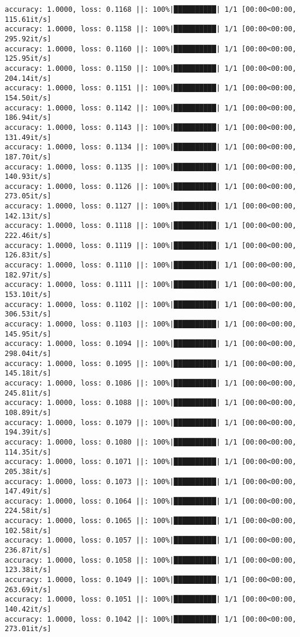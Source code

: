 \documentclass[
]{article}
\begin{document}
\begin{verbatim}
accuracy: 1.0000, loss: 0.1168 ||: 100%|██████████| 1/1 [00:00<00:00, 115.61it/s]
accuracy: 1.0000, loss: 0.1158 ||: 100%|██████████| 1/1 [00:00<00:00, 295.92it/s]
accuracy: 1.0000, loss: 0.1160 ||: 100%|██████████| 1/1 [00:00<00:00, 125.95it/s]
accuracy: 1.0000, loss: 0.1150 ||: 100%|██████████| 1/1 [00:00<00:00, 204.14it/s]
accuracy: 1.0000, loss: 0.1151 ||: 100%|██████████| 1/1 [00:00<00:00, 154.50it/s]
accuracy: 1.0000, loss: 0.1142 ||: 100%|██████████| 1/1 [00:00<00:00, 186.94it/s]
accuracy: 1.0000, loss: 0.1143 ||: 100%|██████████| 1/1 [00:00<00:00, 131.49it/s]
accuracy: 1.0000, loss: 0.1134 ||: 100%|██████████| 1/1 [00:00<00:00, 187.70it/s]
accuracy: 1.0000, loss: 0.1135 ||: 100%|██████████| 1/1 [00:00<00:00, 140.93it/s]
accuracy: 1.0000, loss: 0.1126 ||: 100%|██████████| 1/1 [00:00<00:00, 273.05it/s]
accuracy: 1.0000, loss: 0.1127 ||: 100%|██████████| 1/1 [00:00<00:00, 142.13it/s]
accuracy: 1.0000, loss: 0.1118 ||: 100%|██████████| 1/1 [00:00<00:00, 222.46it/s]
accuracy: 1.0000, loss: 0.1119 ||: 100%|██████████| 1/1 [00:00<00:00, 126.83it/s]
accuracy: 1.0000, loss: 0.1110 ||: 100%|██████████| 1/1 [00:00<00:00, 182.97it/s]
accuracy: 1.0000, loss: 0.1111 ||: 100%|██████████| 1/1 [00:00<00:00, 153.10it/s]
accuracy: 1.0000, loss: 0.1102 ||: 100%|██████████| 1/1 [00:00<00:00, 306.53it/s]
accuracy: 1.0000, loss: 0.1103 ||: 100%|██████████| 1/1 [00:00<00:00, 145.95it/s]
accuracy: 1.0000, loss: 0.1094 ||: 100%|██████████| 1/1 [00:00<00:00, 298.04it/s]
accuracy: 1.0000, loss: 0.1095 ||: 100%|██████████| 1/1 [00:00<00:00, 145.18it/s]
accuracy: 1.0000, loss: 0.1086 ||: 100%|██████████| 1/1 [00:00<00:00, 245.81it/s]
accuracy: 1.0000, loss: 0.1088 ||: 100%|██████████| 1/1 [00:00<00:00, 108.89it/s]
accuracy: 1.0000, loss: 0.1079 ||: 100%|██████████| 1/1 [00:00<00:00, 194.39it/s]
accuracy: 1.0000, loss: 0.1080 ||: 100%|██████████| 1/1 [00:00<00:00, 114.35it/s]
accuracy: 1.0000, loss: 0.1071 ||: 100%|██████████| 1/1 [00:00<00:00, 205.38it/s]
accuracy: 1.0000, loss: 0.1073 ||: 100%|██████████| 1/1 [00:00<00:00, 147.49it/s]
accuracy: 1.0000, loss: 0.1064 ||: 100%|██████████| 1/1 [00:00<00:00, 224.58it/s]
accuracy: 1.0000, loss: 0.1065 ||: 100%|██████████| 1/1 [00:00<00:00, 102.58it/s]
accuracy: 1.0000, loss: 0.1057 ||: 100%|██████████| 1/1 [00:00<00:00, 236.87it/s]
accuracy: 1.0000, loss: 0.1058 ||: 100%|██████████| 1/1 [00:00<00:00, 123.38it/s]
accuracy: 1.0000, loss: 0.1049 ||: 100%|██████████| 1/1 [00:00<00:00, 263.69it/s]
accuracy: 1.0000, loss: 0.1051 ||: 100%|██████████| 1/1 [00:00<00:00, 140.42it/s]
accuracy: 1.0000, loss: 0.1042 ||: 100%|██████████| 1/1 [00:00<00:00, 273.01it/s]

\end{verbatim}
\end{document}
